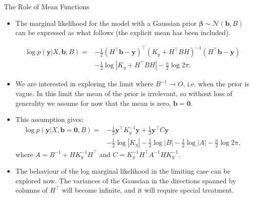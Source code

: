 \begin{frame}[c,allowframebreaks]{The Role of Mean Functions}
\begin{itemize}
\item The marginal likelihood for the model with a Gaussian prior $\bm{\beta} \sim \mathcal{N}(\mathbf{b}, B)$ can be expressed as what follows (the explicit mean has been included).

$$\begin{aligned} 
\log p(\mathbf{y} | X, \mathbf{b}, B)=&-\frac{1}{2}\left(H^{\top} \mathbf{b}-\mathbf{y}\right)^{\top}\left(K_{y}+H^{\top} B H\right)^{-1}\left(H^{\top} \mathbf{b}-\mathbf{y}\right) \\ &-\frac{1}{2} \log \left|K_{y}+H^{\top} B H\right|-\frac{n}{2} \log 2 \pi. 
\end{aligned}$$

\lz
\lz

\item We are interested in exploring the limit where $B^{-1} \rightarrow O$, i.e. when the prior is vague. In this limit the mean of the prior is irrelevant, so without loss of generality we assume for now that the mean is zero, $\mathbf{b} = \mathbf{0}$.

\end{itemize}

\framebreak
\begin{itemize}

\item This assumption gives: 
\vspace{-5mm}
$$\begin{aligned} 
\log p(\mathbf{y} | X, \mathbf{b}=\mathbf{0}, B)=&-\frac{1}{2} \mathbf{y}^{\top} K_{y}^{-1} \mathbf{y}+\frac{1}{2} \mathbf{y}^{\top} C \mathbf{y} \\ &-\frac{1}{2} \log \left|K_{y}\right|-\frac{1}{2} \log |B|-\frac{1}{2} \log |A|-\frac{n}{2} \log 2 \pi, 
\end{aligned}$$
where $A=B^{-1}+H K_{y}^{-1} H^{\top}$ and $C=K_{y}^{-1} H^{\top} A^{-1} H K_{y}^{-1}$.

\vspace{4mm}
\item The behaviour of the log marginal likelihood in the limiting case can be explored now. The variances of the Gaussian in the directions spanned by columns of $H^\top$ will become infinite, and it will require special treatment. 


\end{itemize}
\end{frame}
